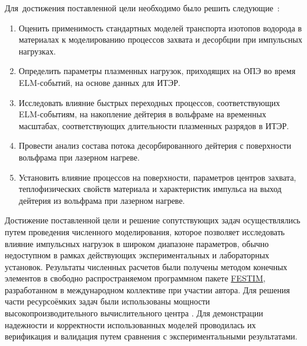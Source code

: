 Для~достижения поставленной цели необходимо было решить следующие~{\tasks}:
\begin{enumerate}[beginpenalty=10000] %
    \item Оценить применимость стандартных моделей транспорта изотопов водорода в материалах к моделированию процессов захвата и десорбции при импульсных нагрузках.
    \item Определить параметры плазменных нагрузок, приходящих на ОПЭ во время ELM-событий, на основе данных для ИТЭР.
    \item Исследовать влияние быстрых переходных процессов, соответствующих ELM-событиям, на накопление дейтерия в вольфраме на временных масштабах, соответствующих длительности плазменных разрядов в ИТЭР.
    \item Провести анализ состава потока десорбированного дейтерия с поверхности вольфрама при лазерном нагреве.
    \item Установить влияние процессов на поверхности, параметров центров захвата, теплофизических свойств материала и характеристик импульса на выход дейтерия из вольфрама при лазерном нагреве.
\end{enumerate}

{\methods} Достижение поставленной цели и решение сопутствующих задач осуществлялись путем проведения численного моделирования, которое позволяет исследовать влияние импульсных нагрузок в широком диапазоне параметров, обычно недоступном в рамках действующих экспериментальных и лабораторных установок. Результаты численных расчетов были получены методом конечных элементов в свободно распространяемом программном пакете \href{https://github.com/festim-dev/FESTIM}{FESTIM}, разработанном в международном коллективе при участии автора. Для решения части ресурсоёмких задач были использованы мощности высокопроизводительного вычислительного центра \thesisOrganizationShort. Для демонстрации надежности и корректности использованных моделей проводилась их верификация и валидация путем сравнения с экспериментальными результатами.

